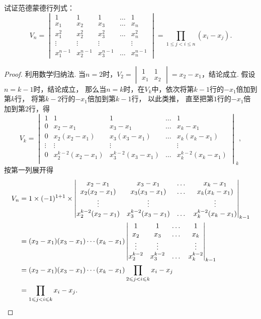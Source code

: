 \begin{example}
试证范德蒙德行列式：
\begin{equation}\label{equation:行列式.范德蒙德行列式}
V_n = \begin{vmatrix}
1 & 1 & 1 & \dots & 1 \\
x_1 & x_2 & x_3 & \dots & x_n \\
x_1^2 & x_2^2 & x_3^2 & \dots & x_n^2 \\
\vdots & \vdots & \vdots& & \vdots \\
x_1^{n-1} & x_2^{n-1} & x_3^{n-1} & \dots & x_n^{n-1}
\end{vmatrix}=\prod\limits_{1 \leqslant j < i \leqslant n}{(x_i-x_j)}.
\end{equation}
\begin{proof}
利用数学归纳法.
当\(n=2\)时，\(V_2 = \begin{vmatrix}
	1 & 1 \\ x_1 & x_2
\end{vmatrix} = x_2 - x_1\)，结论成立.
假设\(n=k-1\)时，结论成立，%
那么当\(n=k\)时，在\(V_k\)中，依次将第\(k-1\)行的\(-x_1\)倍加到第\(k\)行，%
将第\(k-2\)行的\(-x_1\)倍加到第\(k-1\)行，%
以此类推，%
直至把第\(1\)行的\(-x_1\)倍加到第\(2\)行，得\[
V_k = \begin{vmatrix}
1 & 1 & 1 & \dots & 1 \\
0 & x_2 - x_1 & x_3 - x_1 & \dots & x_k - x_1 \\
0 & x_2(x_2 - x_1) & x_3(x_3 - x_1) & \dots & x_k(x_k - x_1) \\
\vdots & \vdots & \vdots & & \vdots \\
0 & x_2^{k-2}(x_2 - x_1) & x_3^{k-2}(x_3 - x_1) & \dots & x_k^{k-2}(x_k - x_1) \\
\end{vmatrix}_k,
\]按第一列展开得\begin{align*}
V_n &= 1 \times (-1)^{1+1} \times \begin{vmatrix}
x_2 - x_1 & x_3 - x_1 & \dots & x_k - x_1 \\
x_2(x_2 - x_1) & x_3(x_3 - x_1) & \dots & x_k(x_k - x_1) \\
\vdots & \vdots & & \vdots \\
x_2^{k-2}(x_2 - x_1) & x_3^{k-2}(x_3 - x_1) & \dots & x_k^{k-2}(x_k - x_1) \\
\end{vmatrix}_{k-1} \\
&= (x_2 - x_1)(x_3 - x_1)\dotsm(x_k - x_1) \begin{vmatrix}
1 & 1 & \dots & 1 \\
x_2 & x_3 & \dots & x_k \\
\vdots & \vdots & & \vdots \\
x_2^{k-2} & x_3^{k-2} & \dots & x_k^{k-2} \\
\end{vmatrix}_{k-1} \\
&= (x_2 - x_1)(x_3 - x_1)\dotsm(x_k - x_1) \prod\limits_{2 \leqslant j < i \leqslant k}{x_i - x_j} \\
&= \prod\limits_{1 \leqslant j < i \leqslant k}{x_i - x_j}.
\qedhere
\end{align*}
\end{proof}
\end{example}

